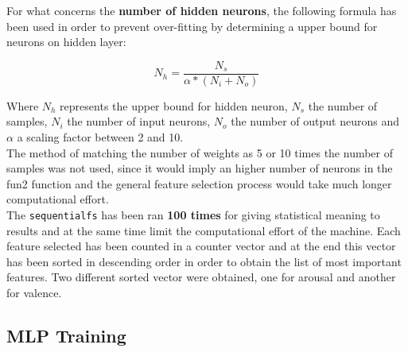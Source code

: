 For what concerns the \textbf{number of hidden neurons}, the following formula has been used in order to prevent over-fitting by determining a upper bound for neurons on hidden layer:

\begin{equation}
	N_{h} = \frac{N_{s}}{\alpha * (N_{i} + N_{o})}
\end{equation}

Where \(N_{h}\) represents the upper bound for hidden neuron, \(N_{s}\) the number of samples, \(N_{i}\) the number of input neurons, \(N_{o}\) the number of output neurons and \(\alpha\) a scaling factor between 2 and 10. \\
The method of matching the number of weights as 5 or 10 times the number of samples was not used, since it would imply an higher number of neurons in the fun2 function and the general feature selection process would take much longer computational effort.\\

The \verb|sequentialfs| has been ran \textbf{100 times} for giving statistical meaning to results and at the same time limit the computational effort of the machine. Each feature selected has been counted in a counter vector and at the end this vector has been sorted in descending order in order to obtain the list of most important features. Two different sorted vector were obtained, one for arousal and another for valence.
 
\subsection{MLP Training}

